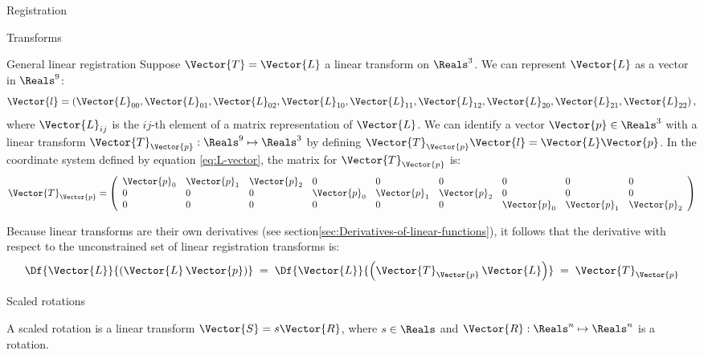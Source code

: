 \begin{plSection}{Registration}
\begin{plSection}{Transforms}
\begin{plSection}{General linear registration}
Suppose $\Vector{T} = \Vector{L}$ a linear transform on $\Reals^3$.
We can represent $\Vector{L}$ as a vector in $\Reals^9$:
\begin{equation}
\label{eq:L-vector}
\Vector{l} = \left(\Vector{L}_{00},\Vector{L}_{01},\Vector{L}_{02},
       \Vector{L}_{10},\Vector{L}_{11},\Vector{L}_{12},
       \Vector{L}_{20},\Vector{L}_{21},\Vector{L}_{22}\right),
\end{equation}
where $\Vector{L}_{ij}$ is the $ij$-th element of a
matrix representation of $\Vector{L}$.
We can identify a vector $\Vector{p} \in \Reals^3$
with a linear transform 
$\Vector{T}_{\Vector{p}} : \Reals^9 \mapsto \Reals^3$
by defining 
$\Vector{T}_{\Vector{p}}\Vector{l} = \Vector{L}\Vector{p}$.
In the coordinate system defined by equation \ref{eq:L-vector},
the matrix for $\Vector{T}_{\Vector{p}}$ is:
\begin{equation}
\label{eq:Tp-matrix}
\Vector{T}_{\Vector{p}} =
\left(
\begin{array}{lllllllll}
\Vector{p}_0 & \Vector{p}_1 & \Vector{p}_2 &  0   &  0   &  0   &  0   &  0   &  0 \\
 0   &  0   &  0   & \Vector{p}_0 & \Vector{p}_1 & \Vector{p}_2 &  0   &  0   &  0 \\
 0   &  0   &  0   &  0   &  0   &  0   & \Vector{p}_0 & \Vector{p}_1 & \Vector{p}_2 \\
\end{array}
\right)
\end{equation}

Because linear transforms are their own derivatives
(see section\ref{sec:Derivatives-of-linear-functions}),
it follows that the derivative with respect to the
unconstrained set of linear registration transforms is:
\begin{equation}
\label{eq:linear-transform-derivative}
\Df{\Vector{L}}{\left( \Vector{L} \, \Vector{p} \right)}
 \; = \;
\Df{\Vector{L}}{\left( \Vector{T}_{\Vector{p}} \, \Vector{L} \right)}
 \; = \;
\Vector{T}_{\Vector{p}}
\end{equation}

\end{plSection}%
\begin{plSection}{Scaled rotations}
\label{sec:Scaled-rotations}

A scaled rotation
is a linear transform $\Vector{S} = s \Vector{R}$,
where $s \in \Reals$ and $\Vector{R} : \Reals^n \mapsto \Reals^n$
is a rotation.


\end{plSection}
\end{plSection}
\end{plSection}

